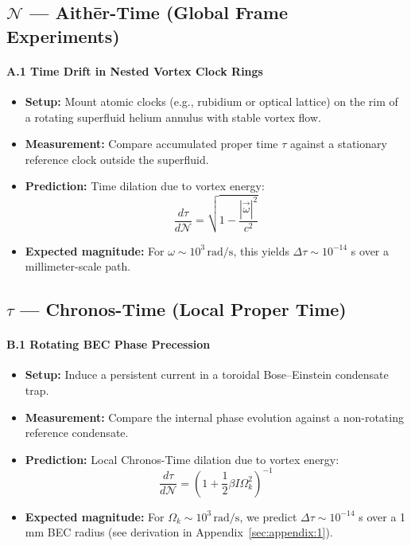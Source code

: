 \documentclass[preprint]{revtex4-2}
\begin{document}
\subsection*{\(\mathcal{N}\) --- Aith\=er-Time (Global Frame Experiments)}

\paragraph{A.1 Time Drift in Nested Vortex Clock Rings}
\begin{itemize}
    \item \textbf{Setup:} Mount atomic clocks (e.g., rubidium or optical lattice) on the rim of a rotating superfluid helium annulus with stable vortex flow.
    \item \textbf{Measurement:} Compare accumulated proper time \(\tau\) against a stationary reference clock outside the superfluid.
    \item \textbf{Prediction:} Time dilation due to vortex energy:
    \[
        \frac{d\tau}{d\mathcal{N}} = \sqrt{1 - \frac{|\vec{\omega}|^2}{c^2}}
    \]
    \item \textbf{Expected magnitude:} For \(\omega \sim 10^3 \, \mathrm{rad/s}\), this yields \(\Delta \tau \sim 10^{-14}\) s over a millimeter-scale path.
\end{itemize}

\subsection*{\(\tau\) --- Chronos-Time (Local Proper Time)}

\paragraph{B.1 Rotating BEC Phase Precession}
\begin{itemize}
    \item \textbf{Setup:} Induce a persistent current in a toroidal Bose--Einstein condensate trap.
    \item \textbf{Measurement:} Compare the internal phase evolution against a non-rotating reference condensate.
    \item \textbf{Prediction:} Local Chronos-Time dilation due to vortex energy:
    \[
        \frac{d\tau}{d\mathcal{N}} = \left(1 + \frac{1}{2} \beta I \Omega_k^2 \right)^{-1}
    \]
    \item \textbf{Expected magnitude:} For \( \Omega_k \sim 10^3 \, \mathrm{rad/s} \), we predict \( \Delta \tau \sim 10^{-14} \) s over a 1 mm BEC radius (see derivation in Appendix~\ref{sec:appendix:1}).
\end{itemize}
\end{document}
